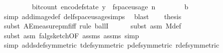 \begin{isabellebody}
\ \ \ \ \ \ \ \ \ bit{\isacharunderscore}{\kern0pt}count\ {\isacharparenleft}{\kern0pt}encode{\isacharunderscore}{\kern0pt}f{}{\isacharunderscore}{\kern0pt}state\ y{\isacharparenright}{\kern0pt}\ {\isasymle}\ f{}{\isacharunderscore}{\kern0pt}space{\isacharunderscore}{\kern0pt}usage\ {\isacharparenleft}{\kern0pt}n{\isacharcomma}{\kern0pt}\ {\isasymepsilon}{\isacharcomma}{\kern0pt}\ {\isasymdelta}{\isacharparenright}{\kern0pt}{\isachardoublequoteclose}\isanewline
\ \ \ \ \isamarkupfalse%
\ b\ \isamarkupfalse%
\ {\isacharparenleft}{\kern0pt}simp\ add{\isacharcolon}{\kern0pt}image{\isacharunderscore}{\kern0pt}def\ del{\isacharcolon}{\kern0pt}f{}{\isacharunderscore}{\kern0pt}space{\isacharunderscore}{\kern0pt}usage{\isachardot}{\kern0pt}simps{\isacharparenright}{\kern0pt}\ \isamarkupfalse%
\ blast\isanewline
\isanewline
\ \ \isamarkupfalse%
\ {\isacharquery}{\kern0pt}thesis\isanewline
\ \ \ \ \isamarkupfalse%
\ {\isacharparenleft}{\kern0pt}subst\ AE{\isacharunderscore}{\kern0pt}measure{\isacharunderscore}{\kern0pt}pmf{\isacharunderscore}{\kern0pt}iff{\isacharcomma}{\kern0pt}\ rule\ ballI{\isacharparenright}{\kern0pt}\isanewline
\ \ \ \ \isamarkupfalse%
\ {\isacharparenleft}{\kern0pt}subst\ {\isacharparenleft}{\kern0pt}asm{\isacharparenright}{\kern0pt}\ M{\isacharunderscore}{\kern0pt}def{\isacharparenright}{\kern0pt}\isanewline
\ \ \ \ \isamarkupfalse%
\ {\isacharparenleft}{\kern0pt}subst\ {\isacharparenleft}{\kern0pt}asm{\isacharparenright}{\kern0pt}\ f{}{\isacharunderscore}{\kern0pt}alg{\isacharunderscore}{\kern0pt}sketch{\isacharbrackleft}{\kern0pt}OF\ assms{\isacharparenleft}{\kern0pt}{}{\isacharparenright}{\kern0pt}\ assms{\isacharparenleft}{\kern0pt}{}{\isacharparenright}{\kern0pt}{\isacharbrackright}{\kern0pt}{\isacharcomma}{\kern0pt}\ simp{\isacharparenright}{\kern0pt}\isanewline
\ \ \ \ \isamarkupfalse%
\ {\isacharparenleft}{\kern0pt}simp\ add{\isacharcolon}{\kern0pt}s{\isacharunderscore}{\kern0pt}def{\isacharbrackleft}{\kern0pt}symmetric{\isacharbrackright}{\kern0pt}\ t{\isacharunderscore}{\kern0pt}def{\isacharbrackleft}{\kern0pt}symmetric{\isacharbrackright}{\kern0pt}\ p{\isacharunderscore}{\kern0pt}def{\isacharbrackleft}{\kern0pt}symmetric{\isacharbrackright}{\kern0pt}\ r{\isacharunderscore}{\kern0pt}def{\isacharbrackleft}{\kern0pt}symmetric{\isacharbrackright}{\kern0pt}{\isacharparenright}{\kern0pt}\isanewline
\ \ \ \ \isamarkupfalse%

\end{isabellebody}
